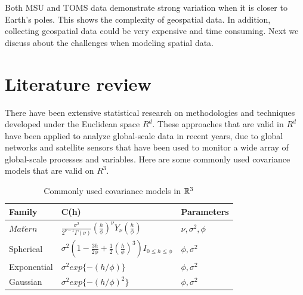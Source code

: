 Both MSU and TOMS data demonstrate strong variation when it is closer to Earth's poles. This shows the complexity of geospatial data. In addition, collecting geospatial data could be very expensive and time consuming. Next we discuss about the challenges when modeling spatial data.






\section{Literature review}

There have been extensive statistical research on methodologies and techniques developed under the Euclidean space $R^d$. These approaches that are valid in $R^d$ have been applied to analyze global-scale data in recent years, due to global networks and satellite sensors that have been used to monitor a wide array of global-scale processes and variables. Here are some commonly used covariance models that are valid on $R^3$.

\begin{table}[H]
\label{parameters}
\centering
\begin{tabular}{|l|l|l|}
\hline
Family & C(h)  & Parameters \\ \hline \hline
$Mat\acute{e}rn$ &  $\frac{\sigma^2}{2^{\nu-1}\Gamma(\nu)} (\frac{h}{\phi})^{\nu} Y_{\nu}(\frac{h}{\phi})$  & $\nu, \sigma^2, \phi$  \\

Spherical & $\sigma^2(1-\frac{3h}{2\phi}+\frac{1}{2}(\frac{h}{\phi})^3)I_{0\le h\le \phi}$ & $\phi, \sigma^2$ \\

Exponential & $\sigma^2exp\{-(h/\phi)\}$ & $\phi, \sigma^2$  \\

Gaussian & $\sigma^2exp \{-(h/\phi)^2\}$ & $\phi, \sigma^2$  \\ \hline
\end{tabular}
\caption[Commonly used covariance models in $\R^3$]{Commonly used covariance models in $\R^3$} %
\end{table}

